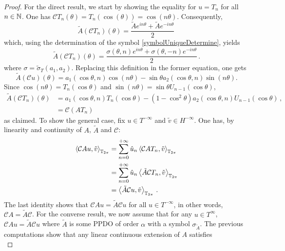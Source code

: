 \documentclass[a4paper]{article}
\begin{document}
\begin{proof}
	For the direct result, we start by showing the equality for $u = T_n$ for all $n \in \mathbb{N}$. One has $\mathcal{C}T_n(\theta) = T_n(\cos(\theta)) = \cos(n\theta)$. Consequently,
	\begin{equation}
	\label{debut}
		\tilde{A}\left(\mathcal{C}T_n\right)(\theta) = \frac{\tilde{A}e^{in\theta}+\tilde{A}e^{-in\theta}}{2}\,
	\end{equation}
	which, using the determination of the symbol \eqref{symbolUniqueDetermine}, yields
	\[\tilde{A}\left(\mathcal{C}T_n\right)(\theta) = \frac{ \sigma(\theta,n)e^{in\theta} + \sigma(\theta,-n)e^{-in\theta}}{2}\,.\]
	where $\sigma = \tilde{\sigma}_T(a_1,a_2)$. Replacing this definition in the former equation, one gets
	\[\tilde{A}\left(\mathcal{C}u\right)(\theta) = a_1(\cos\theta,n)\cos(n\theta) - \sin\theta a_2(\cos\theta,n)\sin(n\theta).\]
	Since $\cos(n\theta) = T_n(\cos\theta)$ and $\sin(n\theta) = \sin\theta U_{n-1}(\cos\theta)$,
	\begin{equation}
		\begin{split}
		\tilde{A}\left(\mathcal{C}T_n\right)(\theta) &= a_1(\cos\theta,n)T_n(\cos\theta) - (1-\cos^2 \theta) a_2(\cos\theta,n) U_{n-1}(\cos\theta)\,,\\
		& = \mathcal{C}(AT_n)
		\end{split}
		\label{fin}
	\end{equation}
	as claimed. To show the general case, fix $u\in T^{-\infty}$ and $\tilde{v} \in H^{-\infty}$. One has, by linearity and continuity of $A$, $\tilde{A}$ and $\mathcal{C}$:
	\[\begin{split}
	\left\langle \mathcal{C}A u,\tilde{v}\right\rangle_{\mathbb{T}_{2\pi}} &= \sum_{n = 0}^{+ \infty} \hat{u}_n \left\langle \mathcal{C}AT_n,\tilde{v}\right\rangle_{\mathbb{T}_{2\pi}}\\
	& =  \sum_{n = 0}^{+ \infty} \hat{u}_n \left\langle \tilde{A} \mathcal{C} T_n,\tilde{v}\right\rangle_{\mathbb{T}_{2\pi}}\\
	&= \left\langle \tilde{A} \mathcal{C}u,\tilde{v}\right\rangle_{\mathbb{T}_{2\pi}}\,.
	\end{split}\]
	The last identity shows that $\mathcal{C}A u = \tilde{A} \mathcal{C} u$ for all $u \in T^{-\infty}$, in other words, $\mathcal{C}A = \tilde{A} \mathcal{C}$. For the converse result, we now assume that for any $u \in T^{\infty}$, $\mathcal{C}Au = \tilde{A}\mathcal{C}u$ where $\tilde{A}$ is some PPDO of order $\alpha$ with a symbol $\sigma_{\tilde{A}}$. The previous computations show that any linear continuous extension of $A$ satisfies 
	\begin{equation}

\end{equation}
\end{proof}
\end{document}

